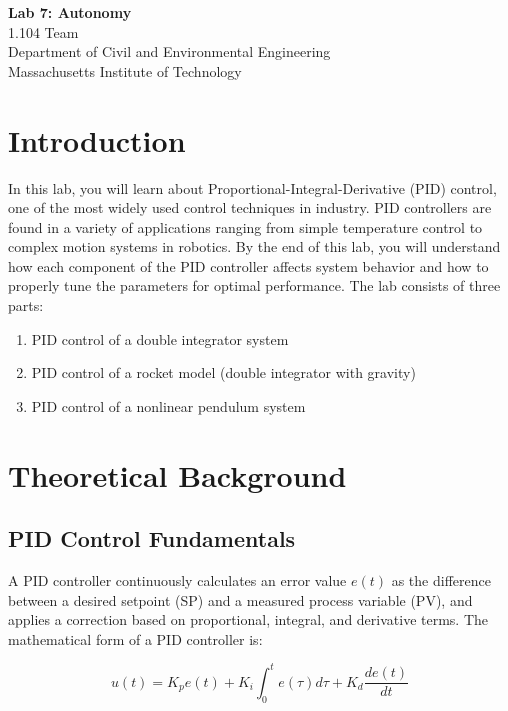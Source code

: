 \documentclass[12pt]{article}
\begin{document}
\begin{center}
    \linespread{1.2}
    \Large{\textbf{Lab 7: Autonomy}}\\
    \large{1.104 Team}\\
    \normalsize{Department of Civil and Environmental Engineering \\ Massachusetts Institute of Technology}\\
\end{center}

\section*{Introduction}
In this lab, you will learn about Proportional-Integral-Derivative (PID) control, one of the most widely used control techniques in industry.  PID controllers are found in a variety of applications ranging from simple temperature control to complex motion systems in robotics.  By the end of this lab, you will understand how each component of the PID controller affects system behavior and how to properly tune the parameters for optimal performance.  The lab consists of three parts: 
\begin{enumerate}
    \item PID control of a double integrator system 
    \item PID control of a rocket model (double integrator with gravity) 
    \item PID control of a nonlinear pendulum system 
\end{enumerate}

\section{Theoretical Background}

\subsection{PID Control Fundamentals}
A PID controller continuously calculates an error value $e(t)$ as the difference between a desired setpoint (SP) and a measured process variable (PV), and applies a correction based on proportional, integral, and derivative terms.  The mathematical form of a PID controller is: 

\begin{equation}
u(t) = K_p e(t) + K_i \int_{0}^{t} e(\tau) d\tau + K_d \frac{de(t)}{dt}
\end{equation}
\end{document}
